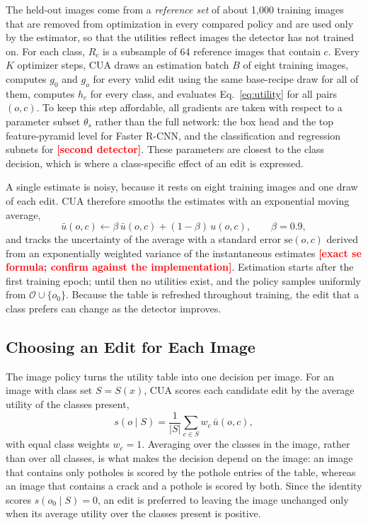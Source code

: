 \documentclass[conference]{IEEEtran}
\newcommand{\todo}[1]{\textcolor{red}{\textbf{[#1]}}}
\begin{document}
The held-out images come from a \emph{reference set} of about 1,000 training images that are removed from optimization in every compared policy and are used only by the estimator, so that the utilities reflect images the detector has not trained on. For each class, $R_c$ is a subsample of 64 reference images that contain $c$. Every $K$ optimizer steps, CUA draws an estimation batch $B$ of eight training images, computes $g_0$ and $g_o$ for every valid edit using the same base-recipe draw for all of them, computes $h_c$ for every class, and evaluates Eq.~\eqref{eq:utility} for all pairs $(o,c)$. To keep this step affordable, all gradients are taken with respect to a parameter subset $\theta_s$ rather than the full network: the box head and the top feature-pyramid level for Faster R-CNN, and the classification and regression subnets for \todo{second detector}. These parameters are closest to the class decision, which is where a class-specific effect of an edit is expressed.

A single estimate is noisy, because it rests on eight training images and one draw of each edit. CUA therefore smooths the estimates with an exponential moving average,
\begin{equation}
\bar u(o,c)\leftarrow\beta\,\bar u(o,c)+(1-\beta)\,u(o,c),\qquad\beta=0.9,
\label{eq:ema}
\end{equation}
and tracks the uncertainty of the average with a standard error $\mathrm{se}(o,c)$ derived from an exponentially weighted variance of the instantaneous estimates \todo{exact se formula; confirm against the implementation}. Estimation starts after the first training epoch; until then no utilities exist, and the policy samples uniformly from $\mathcal{O}\cup\{o_0\}$. Because the table is refreshed throughout training, the edit that a class prefers can change as the detector improves.

\subsection{Choosing an Edit for Each Image}
\label{sec:method_policy}

The image policy turns the utility table into one decision per image. For an image with class set $S=S(x)$, CUA scores each candidate edit by the average utility of the classes present,
\begin{equation}
s(o\mid S)=\frac{1}{|S|}\sum_{c\in S}w_c\,\bar u(o,c),
\label{eq:score}
\end{equation}
with equal class weights $w_c=1$. Averaging over the classes in the image, rather than over all classes, is what makes the decision depend on the image: an image that contains only potholes is scored by the pothole entries of the table, whereas an image that contains a crack and a pothole is scored by both. Since the identity scores $s(o_0\mid S)=0$, an edit is preferred to leaving the image unchanged only when its average utility over the classes present is positive.
\end{document}
